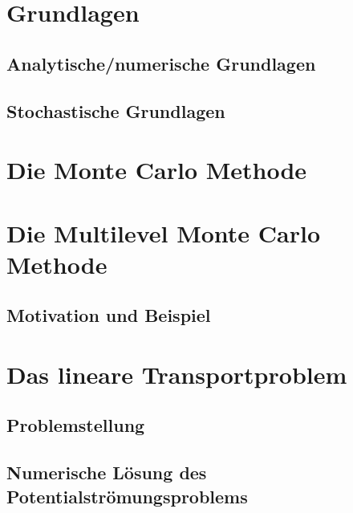 \documentclass[12pt,a4paper]{scrartcl}
\theoremstyle{definition}
\numberwithin{equation}{section}
\begin{document}
\section{Grundlagen}
\subsection{Analytische/numerische Grundlagen}

\newpage  %
\subsection{Stochastische Grundlagen}

\newpage  %
\section{Die Monte Carlo Methode}
\label{MC}

\newpage  %
\section{Die Multilevel Monte Carlo Methode}
\label{MLMC}
\subsection{Motivation und Beispiel}


\newpage  %

\section{Das lineare Transportproblem}
\label{TP}
\subsection{Problemstellung}
 
 \newpage  %
\subsection{Numerische Lösung des Potentialströmungsproblems}

\newpage  %
\end{document}
